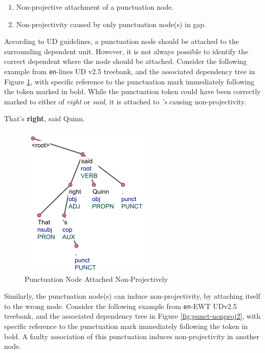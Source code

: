 \begin{enumerate}
    \item Non-projective attachment of a punctuation node.
    \item Non-projectivity caused by only punctuation node(s) in gap.
\end{enumerate}

According to UD guidelines, a punctuation node should be attached to the surrounding dependent unit. However, it is not always possible to identify the correct dependent where the node should be attached. Consider the following example from \verb|en|-lines UD v2.5 treebank, and the associated dependency tree in Figure \ref{fig:punct-nonproj}, with specific reference to the punctuation mark immediately following the token marked in bold. While the punctuation token could have been correctly marked to either of \textit{right} or \textit{said}, it is attached to \textit{'s} causing non-projectivity.

\begin{example}
That's \textbf{right}, said Quinn.
\end{example}

\begin{figure}[H]
    \centering
    \includegraphics{img/punct-nonproj.png}
    \caption{Punctuation Node Attached Non-Projectively}
    \label{fig:punct-nonproj}
\end{figure}

Similarly, the punctuation node(s) can induce non-projectivity, by attaching itself to the wrong node. Consider the following example from \verb|en|-EWT UDv2.5 treebank, and the associated dependency tree in Figure \ref{fig:punct-nonproj2}, with specific reference to the punctuation mark immediately following the token in bold. A faulty association of this punctuation induces non-projectivity in another node.

